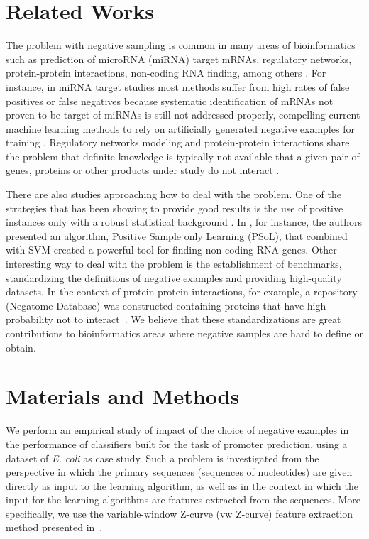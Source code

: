 \documentclass[runningheads,a4paper]{llncs}
\begin{document}
\section{Related Works}

The problem with negative sampling is common in many  areas of bioinformatics such as prediction of microRNA (miRNA) target mRNAs, regulatory networks, protein-protein interactions, non-coding RNA finding, among others \cite{bandyopadhyay2009,cerulo2010,park2011,wang2006}. For instance, in miRNA target studies most methods suffer from high rates of false positives or false negatives because systematic identification of mRNAs not proven to be target of miRNAs is still not addressed properly, compelling current machine learning methods to rely on artificially generated negative examples for training \cite{bandyopadhyay2009}. Regulatory networks modeling and protein-protein interactions share the problem that definite knowledge is typically not available that a given pair of genes, proteins or other products under study do not interact \cite{cerulo2010,park2011}.

There are also studies approaching how to deal with the problem. One of the strategies that has been showing to provide good results is the use of positive instances only with a robust statistical background \cite{cerulo2010,wang2006,yousef2008}. In \cite{wang2006}, for instance, the authors presented an algorithm, Positive Sample only Learning (PSoL), that combined with SVM created a powerful tool for finding non-coding RNA genes. Other interesting way to deal with the problem  is the establishment of benchmarks, standardizing the definitions of negative examples and providing high-quality datasets. In the context of protein-protein interactions, for example,  a repository (Negatome Database) was constructed containing proteins that have high probability not to interact~\cite{smialowski2010}. We believe that these standardizations are great contributions to bioinformatics areas where negative samples are hard to define or obtain.

\section{Materials and Methods}

We perform an empirical study of impact of the choice of negative examples in the performance of  classifiers built for the task of   promoter prediction, using a dataset of  {\it E. coli} as case study.  Such a problem is investigated from the perspective in which the primary sequences (sequences of nucleotides) are given directly as input to the learning algorithm, as well as in the context in which the input for the learning algorithms are features extracted from the sequences. More specifically, we use the variable-window Z-curve (vw Z-curve) feature extraction method presented in~\cite{song2011}.
\end{document}
